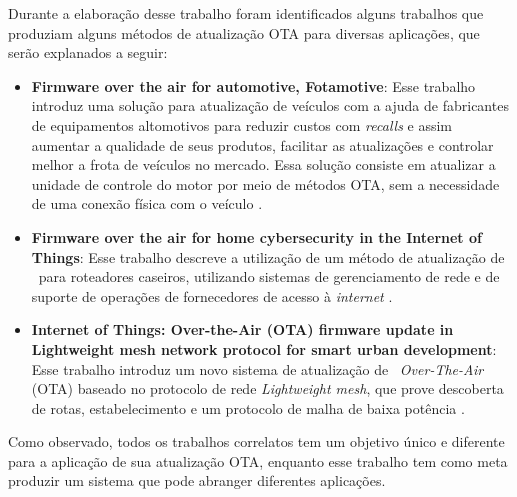 Durante a elaboração desse trabalho foram identificados alguns trabalhos que produziam alguns métodos de atualização OTA para diversas aplicações, que serão explanados a seguir:


\begin{itemize}

    \item \textbf{Firmware over the air for automotive, Fotamotive}: Esse trabalho introduz uma solução para atualização de veículos com a ajuda de fabricantes de equipamentos altomotivos para reduzir custos com \textit{recalls} e assim aumentar a qualidade de seus produtos, facilitar as atualizações e controlar melhor a frota de veículos no mercado. Essa solução consiste em atualizar a unidade de controle do motor por meio de métodos OTA, sem a necessidade de uma conexão física com o veículo \cite{Odat2014}.

    \item \textbf{Firmware over the air for home cybersecurity in the Internet of Things}: Esse trabalho descreve a utilização de um método de atualização de \firmware\ para roteadores caseiros, utilizando sistemas de gerenciamento de rede e de suporte de operações de fornecedores de acesso à \textit{internet} \cite{Teng2017}.
    
    \item \textbf{Internet of Things: Over-the-Air (OTA) firmware update in Lightweight mesh network protocol for smart urban development}: Esse trabalho introduz um novo sistema de atualização de \firmware\ \textit{Over-The-Air} (OTA) baseado no protocolo de rede \textit{Lightweight mesh}, que prove descoberta de rotas, estabelecimento e um protocolo de malha de baixa potência \cite{Chandra2016}.

\end{itemize}

Como observado, todos os trabalhos correlatos tem um objetivo único e diferente para a aplicação de sua atualização OTA, enquanto esse trabalho tem como meta produzir um sistema que pode abranger diferentes aplicações.